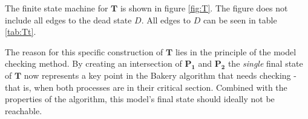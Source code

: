 The finite state machine for $\mathbf{T}$ is shown in figure \ref{fig:T}. The figure does not include all edges to the dead state $D$. All edges to $D$ can be seen in table \ref{tab:Tt}.



The reason for this specific construction of $\mathbf{T}$ lies in the principle of the model checking method. By creating an intersection of $\mathbf{P_1}$ and $\mathbf{P_2}$ the \textit{single} final state of $\mathbf{T}$ now represents a key point in the Bakery algorithm that needs checking - that is, when both processes are in their critical section. Combined with the properties of the algorithm, this model's final state should ideally not be reachable. 